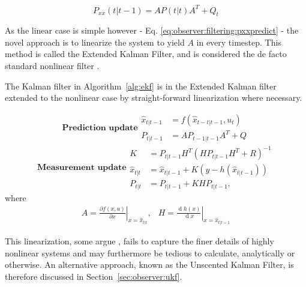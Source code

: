     \begin{equation}
        \label{eq:observer:filtering:pxxpredict}
        P_{xx}(t|t-1) = AP(t|t)A^{T} + Q_{t}
    \end{equation}

    As the linear case is simple however - Eq. \eqref{eq:observer:filtering:pxxpredict} - the
    novel approach is to linearize the system to yield $A$ in every timestep.
    This method is called the Extended Kalman Filter, and is considered the
    de facto standard nonlinear filter \cite{Julier04nonlinear}.

    \begin{algorithm}
        \label{alg:ekf}
        The Kalman filter in Algorithm~\ref{alg:ekf} is in the Extended Kalman filter extended to the
        nonlinear case by straight-forward linearization where necessary.

        \begin{subequations}
            \textbf{Prediction update}
            \begin{align}
                \hat{x}_{t|t-1} &= f\left( \hat{x}_{t-t|t-1}, u_{t} \right) \\
                P_{t|t-1} &= A P_{t-1|t-1} A^{T} + Q
            \end{align}
        \end{subequations}
        \begin{subequations}\textbf{Measurement update}
            \begin{align}
                K &= P_{t|t-1} H^{T} \left( H P_{t|t-1} H^{T} + R \right)^{-1} \label{eq:filtering:kalmanK} \\
                \hat{x}_{t|t} &= \hat{x}_{t|t-1} + K \left( y - h(\hat{x}_{t|t-1}) \right) \\
                P_{t|t} &= P_{t|t-1} + K H P_{t|t-1},
            \end{align}
        \end{subequations}
        where
        \begin{equation}
            \begin{array}{cc}
                A = \left.\frac{\partial f(x,u)}{\partial x}\right|_{x = \hat{x}_{t|t}}, & H = \left.\frac{\operatorname{d}\!h(x)}{\operatorname{d}\!x}\right|_{x = \hat{x}_{t|t-1}}
            \end{array}
        \end{equation}
    \end{algorithm}

    This linearization, some argue \cite{Julier95anewapproach}, fails to capture the finer details
    of highly nonlinear systems and may furthermore be tedious to
    calculate, analytically or otherwise. An alternative approach, known as the Unscented Kalman Filter, is therefore
    discussed in Section~\ref{sec:observer:ukf}.

